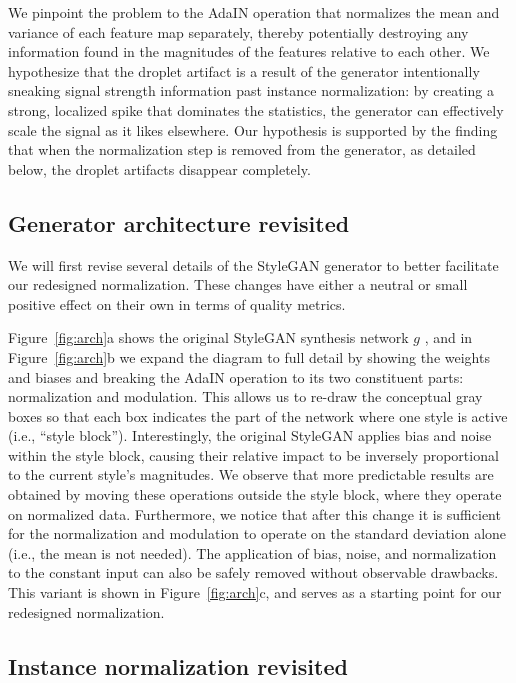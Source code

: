 \documentclass[10pt,twocolumn,letterpaper]{article}
\begin{document}
We pinpoint the problem to the AdaIN operation that normalizes the mean and variance of each feature map separately, thereby potentially destroying any information found in the magnitudes of the features relative to each other.
We hypothesize that the droplet artifact is a result of the generator intentionally sneaking signal strength information past instance normalization:
by creating a strong, localized spike that dominates the statistics, the generator can effectively scale the signal as it likes elsewhere.
Our hypothesis is supported by the finding that when the normalization step is removed from the generator, as detailed below, the droplet artifacts disappear completely.

\subsection{Generator architecture revisited}

We will first revise several details of the StyleGAN generator to better facilitate our redesigned normalization. These changes have either a neutral or small positive effect on their own in terms of quality metrics.

Figure~\ref{fig:arch}a shows the original StyleGAN synthesis network $g$ \cite{Karras2018}, and in Figure~\ref{fig:arch}b we expand the diagram to full detail by showing the weights and biases and breaking the AdaIN operation to its two constituent parts: normalization and modulation. This allows us to re-draw the conceptual gray boxes so that each box indicates the part of the network where one style is active (i.e., ``style block'').
Interestingly, the original StyleGAN applies bias and noise within the style block, causing their relative impact to be inversely proportional to the current style's magnitudes. We observe that more predictable results are obtained by moving these operations outside the style block, where they operate on normalized data. Furthermore, we notice that after this change it is sufficient for the normalization and modulation to operate on the standard deviation alone (i.e., the mean is not needed).
The application of bias, noise, and normalization to the constant input can also be safely removed without observable drawbacks. 
This variant is shown in Figure~\ref{fig:arch}c, and serves as a starting point for our redesigned normalization.

\subsection{Instance normalization revisited}
\end{document}
